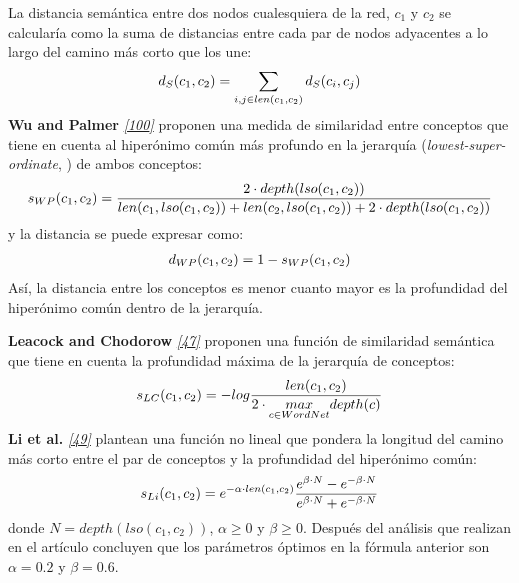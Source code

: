 \documentclass[a4paper,12pt,spanish]{book}
\begin{document}
La distancia semántica entre dos nodos cualesquiera de la red, \(c_1\) y \(c_2\)
se calcularía como la suma de distancias entre cada par de nodos adyacentes a lo largo
del camino más corto que los une:
\begin{gather}
\begin{split}d_{S}(c_1, c_2) = \sum\limits_{i,j \in len(c_1, c_2)} d_{S}(c_i, c_j)\end{split}\notag
\end{gather}
\textbf{Wu and Palmer} \label{1.state-of-the-art/ii.medidas-distancia:id40}{\hyperref[zreferences:wu1994]{\emph{{[}100{]}}}} proponen una medida de similaridad entre conceptos que tiene
en cuenta al hiperónimo común más profundo en la jerarquía (\emph{lowest-super-ordinate}, )
de ambos conceptos:
\begin{gather}
\begin{split}s_{WP}(c_1, c_2) = \frac{2 \cdot depth(lso(c_1, c_2))}{len(c_1, lso(c_1, c_2)) + len(c_2, lso(c_1, c_2)) + 2 \cdot depth(lso(c_1, c_2))}\end{split}\notag
\end{gather}
y la distancia se puede expresar como:
\begin{gather}
\begin{split}d_{WP}(c_1, c_2) = 1 - s_{WP}(c_1, c_2)\end{split}\notag
\end{gather}
Así, la distancia entre los conceptos es menor cuanto mayor es la profundidad del hiperónimo común dentro de la jerarquía.

\textbf{Leacock and Chodorow} \label{1.state-of-the-art/ii.medidas-distancia:id41}{\hyperref[zreferences:leacock1998]{\emph{{[}47{]}}}} proponen una función de similaridad semántica
que tiene en cuenta la profundidad máxima de la jerarquía de conceptos:
\begin{gather}
\begin{split}s_{LC}(c_1, c_2) = -log \frac{len(c_1, c_2)}{2 \cdot \underset{c \in WordNet}{max} depth(c)}\end{split}\notag
\end{gather}
\textbf{Li et al.} \label{1.state-of-the-art/ii.medidas-distancia:id42}{\hyperref[zreferences:li2003]{\emph{{[}49{]}}}} plantean una función no lineal que pondera la longitud del camino
más corto entre el par de conceptos y la profundidad del hiperónimo común:
\begin{gather}
\begin{split}s_{Li}(c_1, c_2) = e^{-\alpha \cdot len(c_1, c_2)} \frac{e^{\beta \cdot N} - e^{-\beta \cdot N}}{e^{\beta \cdot N} + e^{-\beta \cdot N}}\end{split}\notag
\end{gather}
donde \(N = depth(lso(c_1, c_2))\), \(\alpha \geq 0\) y \(\beta \geq 0\). Después del
análisis que realizan en el artículo concluyen que los parámetros óptimos en la fórmula
anterior son \(\alpha = 0.2\) y \(\beta = 0.6\).
\end{document}
